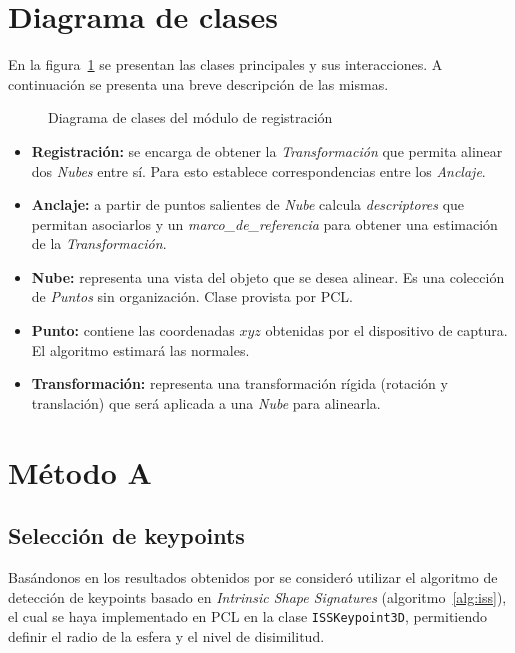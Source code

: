 	\section{Diagrama de clases}
		En la figura~\ref{fig:align_class} se presentan las clases principales y sus interacciones.
		A continuación se presenta una breve descripción de las mismas.
		\begin{figure}
			\caption{\label{fig:align_class}Diagrama de clases del módulo de registración}
		\end{figure}

		\begin{itemize}
			\item {\bfseries Registración:} se encarga de obtener la \emph{Transformación} que
				permita alinear dos \emph{Nubes} entre sí.  Para esto establece
				correspondencias entre los \emph{Anclaje}.
			\item {\bfseries Anclaje:} a partir de puntos salientes de \emph{Nube} calcula
				\emph{descriptores}  que permitan asociarlos y un
				\emph{marco\_de\_referencia} para obtener una estimación de la
				\emph{Transformación}.
			\item {\bfseries Nube:} representa una vista del objeto que se desea alinear.
				Es una colección de \emph{Puntos} sin organización. Clase
				provista por PCL.
			\item {\bfseries Punto:} contiene las coordenadas $xyz$ obtenidas por el
				dispositivo de captura. El algoritmo estimará las normales.
			\item {\bfseries Transformación:} representa una transformación rígida
				(rotación y translación) que será aplicada a una \emph{Nube}
				para alinearla.
		\end{itemize}

	\section{Método A}
		\subsection{Selección de keypoints}
			Basándonos en los resultados obtenidos por %
			se consideró utilizar el algoritmo de detección de keypoints basado en \emph{Intrinsic Shape Signatures} (algoritmo~\ref{alg:iss}),
			el cual se haya implementado en PCL en la clase \texttt{ISSKeypoint3D}, permitiendo
			definir el radio de la esfera y el nivel de disimilitud.


